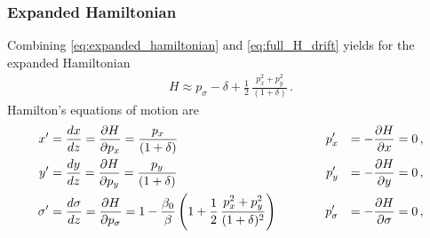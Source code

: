 \subsubsection{Expanded Hamiltonian}
Combining \eqref{eq:expanded_hamiltonian} and \eqref{eq:full_H_drift} yields for the expanded Hamiltonian
\begin{align}
H \approx p_\sigma - \delta + \frac{1}{2} \, \frac{p_x^2+p_y^2}{(1+\delta)} \, .
\end{align}
Hamilton's equations of motion are 
\begin{alignat}{4}
x' &= \frac{d x}{d z} = \frac{\partial H}{\partial p_x} = \frac{p_x}{ (1+\delta) } &p_x' &&= -\frac{\partial H}{\partial x} = 0 \, , \\
y' &= \frac{d y}{d z} = \frac{\partial H}{\partial p_y} = \frac{p_y}{ (1+\delta) } \quad \quad &p_y' &&= -\frac{\partial H}{\partial y} = 0 \, , \\
\sigma' &=  \frac{d \sigma}{d z} = \frac{\partial H}{\partial p_\sigma} =  1 - \frac{\beta_0}{\beta} \left( 1 + \frac{1}{2} \, \frac{p_x^2 + p_y^2}{(1+\delta)^2}  \right)   \quad \quad \quad  &p_\sigma' &&= -\frac{\partial H}{\partial \sigma} = 0 \, , 
\end{alignat}


